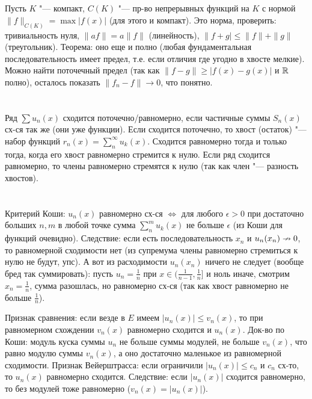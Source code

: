 \section{} %
Пусть $K$ "--- компакт, $C(K)$ "--- пр-во непрерывных функций на $K$ с нормой
$\|f\|_{C(K)}=\max |f(x)|$ (для этого и компакт).
Это норма, проверить: тривиальность нуля, $\|af\|=a\|f\|$ (линейность), $\|f+g|\le\|f\|+\|g\|$ (треугольник).
Теорема: оно еще и полно (любая фундаментальная последовательность имеет предел, т.е. если отличия где угодно в хвосте мелкие).
Можно найти поточечный предел (так как $\|f-g\| \ge |f(x)-g(x)|$ и $\mathbb{R}$ полно), осталось показать $\|f_n-f\| \to 0$, что понятно.

\section{} %
Ряд $\sum u_n(x)$ сходится поточечно/равномерно, если частичные суммы $S_n(x)$ сх-ся так же (они уже функции).
Если сходится поточечно, то хвост (остаток) "--- набор функций $r_n(x)=\sum_n^\infty u_k(x)$.
Сходится равномерно тогда и только тогда, когда его хвост равномерно стремится к нулю.
Если ряд сходится равномерно, то члены равномерно стремятся к нулю (так как член "--- разность хвостов).

\section{} %
Критерий Коши: $u_n(x)$ равномерно сх-ся $\iff$ для любого $\epsilon > 0$ при достаточно больших $n, m$
в любой точке сумма $\sum_n^m u_k(x)$ не больше $\epsilon$ (из Коши для функций очевидно).
Следствие: если есть последовательность $x_n$ и $u_n(x_n) \nrightarrow 0$, то равномерной сходимости нет (из супремума члены равномерно стремиться к нулю не будут, упс).
А вот из расходимости $u_n(x_n)$ ничего не следует (вообще бред так суммировать): пусть $u_n = \frac 1 n$ при $x \in (\frac{1}{n-1}, \frac1n]$ и ноль иначе,
смотрим $x_n=\frac 1 n$, сумма разошлась, но равномерно сх-ся (так как хвост равномерно не больше $\frac 1 n$).

Признак сравнения: если везде в $E$ имеем $|u_n(x)| \le v_n(x)$, то при равномерном схождении $v_n(x)$ равномерно сходится и $u_n(x)$.
Док-во по Коши: модуль куска суммы $u_n$ не больше суммы модулей, не больше $v_n(x)$, что равно модулю суммы $v_n(x)$, а оно достаточно маленькое
из равномерной сходимости.
Признак Вейерштрасса: если ограничили $|u_n(x)| \le c_n$ и $c_n$ сх-то, то $u_n(x)$ равномерно сходится.
Следствие: если $|u_n(x)|$ сходится равномерно, то без модулей тоже равномерно ($v_n(x)=|u_n(x)|$).


